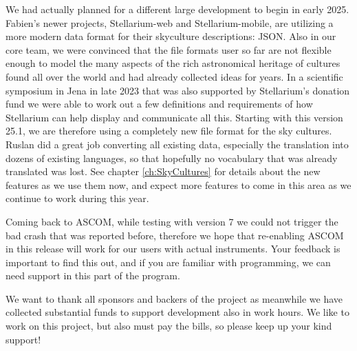 We had actually planned for a different large development to begin in early 2025. Fabien's newer projects, Stellarium-web and Stellarium-mobile, 
are utilizing a more modern data format for their skyculture descriptions: JSON. Also in our core team, 
we were convinced that the file formats user so far are not flexible enough to model the many aspects of the rich astronomical 
heritage of cultures found all over the world and had already collected ideas for years. 
In a scientific symposium in Jena in late 2023 that was also supported by Stellarium's donation 
fund we were able to work out a few definitions and requirements of how Stellarium can help display and communicate 
all this. Starting with this version 25.1, we are therefore using a completely new file format for the sky cultures. 
Ruslan  did a great job converting all existing data, especially the translation into dozens of existing languages, 
so that hopefully no vocabulary that was already translated was lost.  See chapter \ref{ch:SkyCultures} for details about the new features
as we use them now, and expect more features to come in this area as we continue to work during this year. 

Coming back to ASCOM, while testing with version 7 we could not trigger the bad crash that was reported before, 
therefore we hope that re-enabling ASCOM in this release will work for our users with actual instruments. 
Your feedback is important to find this out, and if you are familiar with programming, we can need support in this part of the program. 

We want to thank all sponsors and backers of the project as meanwhile we have collected substantial funds to support development 
also in work hours. We like to work on this project, but also must pay the bills, so please keep up your kind support! 


\iffalse
If that was not enough, yet another contributor, Wang Siliang, has fulfilled a long-standing 
desire for quite a few astrophotographers.  He created a plugin with which you can place your own 
photos inside Stellarium, with just a few mouseclicks and connection to astrometry.net.

Have you ever wondered what the actual size of the focal area was for the modern generation of automated survey telescopes?  
Thanks to yet another external contribution by Josh Meyers, a professional astronomer involved in commissioning 
the Vera C. Rubin telescope, his plugin that he developed and used during this commissioning can show the sensor grid of 
this and other telescopes, and you can even configure your own. 
\fi


